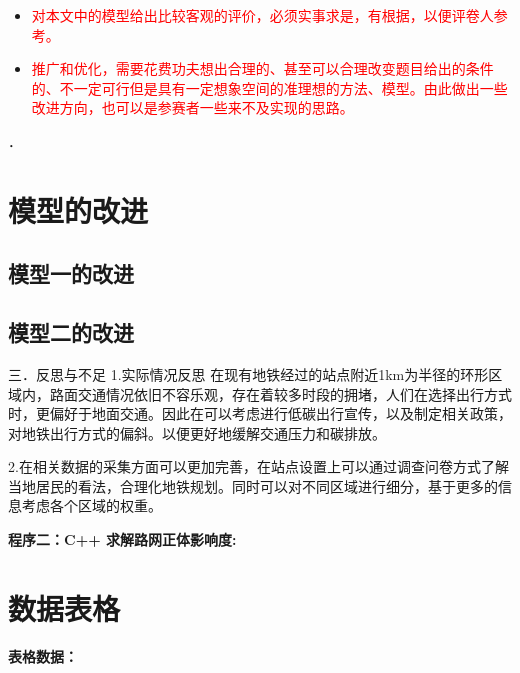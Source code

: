 \documentclass[12pt,a4paper]{mcmthesis}
\begin{document}
    \begin{itemize}

        \item \textcolor{red}{对本文中的模型给出比较客观的评价，必须实事求是，有根据，以便评卷人参考。}

        \item \textcolor{red}{推广和优化，需要花费功夫想出合理的、甚至可以合理改变题目给出的条件的、不一定可行但是具有一定想象空间的准理想的方法、模型。由此做出一些改进方向，也可以是参赛者一些来不及实现的思路。}
    \end{itemize}

    ．


    \section{模型的改进}

    \subsection{模型一的改进}

    \subsection{模型二的改进}
    三．反思与不足
    1.实际情况反思
    在现有地铁经过的站点附近1km为半径的环形区域内，路面交通情况依旧不容乐观，存在着较多时段的拥堵，人们在选择出行方式时，更偏好于地面交通。因此在可以考虑进行低碳出行宣传，以及制定相关政策，对地铁出行方式的偏斜。以便更好地缓解交通压力和碳排放。

    2.在相关数据的采集方面可以更加完善，在站点设置上可以通过调查问卷方式了解当地居民的看法，合理化地铁规划。同时可以对不同区域进行细分，基于更多的信息考虑各个区域的权重。

    \textcolor[rgb]{0.98,0.00,0.00}{\textbf{程序二：C++ 求解路网正体影响度:}}
    

    \newpage
    \setcounter{table}{0}
    \section*{数据表格}
    \textcolor[rgb]{0.98,0.00,0.00}{\textbf{表格数据：}}
    
\newpage


\end{document}
